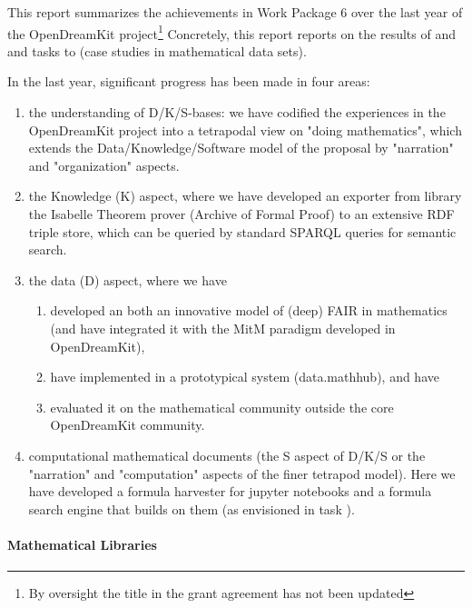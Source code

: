 This report summarizes the achievements in Work Package 6 over the last year of the OpenDreamKit project\footnote{By oversight the title in the grant agreement has not been updated} Concretely, this report reports on the results of  and  and tasks  to  (case studies in mathematical data sets).

In the last year, significant progress has been made in four areas:
\begin{enumerate} \item the understanding of D/K/S-bases: we have codified the experiences in the OpenDreamKit project into a tetrapodal view on "doing mathematics", which extends the Data/Knowledge/Software model of the proposal by "narration" and "organization" aspects. \item the Knowledge (K) aspect, where we have developed an exporter from library the Isabelle Theorem prover (Archive of Formal Proof) to an extensive RDF triple store, which can be queried by standard SPARQL queries for semantic search. \item the data (D) aspect, where we have
  \begin{enumerate}
  \item developed an both an innovative model of (deep) FAIR in mathematics (and have integrated it with the MitM paradigm developed in OpenDreamKit),
  \item have implemented in a prototypical system (data.mathhub), and have
  \item evaluated it on the mathematical community outside the core OpenDreamKit community.
  \end{enumerate}
\item computational mathematical documents (the S aspect of D/K/S or the "narration" and "computation" aspects of the finer tetrapod model). Here we have developed a formula harvester for jupyter notebooks and a formula search engine that builds on them (as envisioned in task ).
\end{enumerate}
 


\paragraph{Mathematical Libraries}


